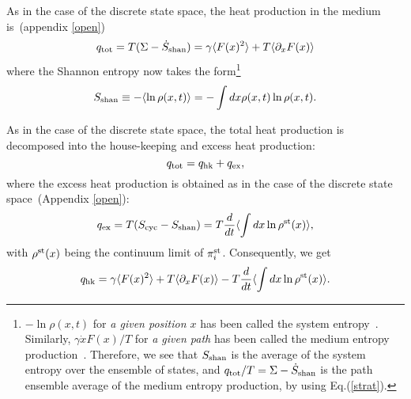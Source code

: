\documentclass[aps,pre,amsmath,amssymb,floatfix,preprint,nofootinbib]{revtex4}
\begin{document}
As in the case of the discrete state space, the heat production in the medium is~(appendix \ref{open})
\begin{equation}
q_{\rm tot} = T (\Sigma - \dot S_{\rm shan}) =  \gamma  \langle  {F(x)^2} \rangle + T \langle \partial_x F(x) \rangle
\end{equation}
where the Shannon entropy now takes the form\footnote{ $-\ln \rho(x,t)$ for  {\it a given position $x$} has been called the system entropy~\cite{seif1,seif2}. Similarly, $\gamma \dot x  F(x)/T$ for  {\it a given path} has been called the medium entropy production~\cite{seif1,seif2}. Therefore, we see that $S_{\rm shan}$ is the average of the system entropy over the ensemble of states, and $q_{\rm tot}/T = \Sigma - \dot S_{\rm shan}$ is the path ensemble average of the medium entropy production, by using Eq.(\ref{strat}).}
\begin{equation}
S_{\rm shan} \equiv -\langle \ln \rho(x,t) \rangle = -\int dx \rho(x,t) \ln \rho(x,t).
\end{equation}

As in the case of the discrete state space, the total heat production is decomposed into the house-keeping and excess heat production:
\begin{equation}
q_{\rm tot} = q_{\rm hk} + q_{\rm ex},
\end{equation}
where the excess heat production is obtained as in the case of the discrete state space~(Appendix \ref{open}):
\begin{equation}
q_{\rm ex} = T(S_{\rm cyc} -S_{\rm shan}) = T \frac{d}{dt}\langle \int dx \ln \rho^{\rm st}(x) \rangle, \label{qexc}
\end{equation}
with $\rho^{\rm st}(x)$ being the continuum limit of $\pi^{\rm st}_i$.
Consequently, we get
\begin{equation}
q_{\rm hk} =    \gamma  \langle  {F(x)^2} \rangle + T \langle \partial_x F(x) \rangle - T \frac{d}{dt}\langle \int dx \ln \rho^{\rm st}(x) \rangle. \label{qhkc}
\end{equation}
\end{document}
